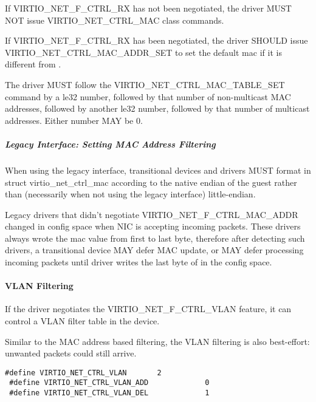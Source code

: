 If VIRTIO_NET_F_CTRL_RX has not been negotiated,
the driver MUST NOT issue VIRTIO_NET_CTRL_MAC class commands.

If VIRTIO_NET_F_CTRL_RX has been negotiated,
the driver SHOULD issue VIRTIO_NET_CTRL_MAC_ADDR_SET
to set the default mac if it is different from .

The driver MUST follow the VIRTIO_NET_CTRL_MAC_TABLE_SET command
by a le32 number, followed by that number of non-multicast
MAC addresses, followed by another le32 number, followed by
that number of multicast addresses.  Either number MAY be 0.

\subparagraph{Legacy Interface: Setting MAC Address Filtering}\label{sec:Device Types / Network Device / Device Operation / Control Virtqueue / Setting MAC Address Filtering / Legacy Interface: Setting MAC Address Filtering}
When using the legacy interface, transitional devices and drivers
MUST format  in struct virtio_net_ctrl_mac
according to the native endian of the guest rather than
(necessarily when not using the legacy interface) little-endian.

Legacy drivers that didn't negotiate VIRTIO_NET_F_CTRL_MAC_ADDR
changed  in config space when NIC is accepting
incoming packets. These drivers always wrote the mac value from
first to last byte, therefore after detecting such drivers,
a transitional device MAY defer MAC update, or MAY defer
processing incoming packets until driver writes the last byte
of  in the config space.

\paragraph{VLAN Filtering}\label{sec:Device Types / Network Device / Device Operation / Control Virtqueue / VLAN Filtering}

If the driver negotiates the VIRTIO_NET_F_CTRL_VLAN feature, it
can control a VLAN filter table in the device.

\begin{note}
Similar to the MAC address based filtering, the VLAN filtering
is also best-effort: unwanted packets could still arrive.
\end{note}

\begin{lstlisting}
#define VIRTIO_NET_CTRL_VLAN       2
 #define VIRTIO_NET_CTRL_VLAN_ADD             0
 #define VIRTIO_NET_CTRL_VLAN_DEL             1
\end{lstlisting}

